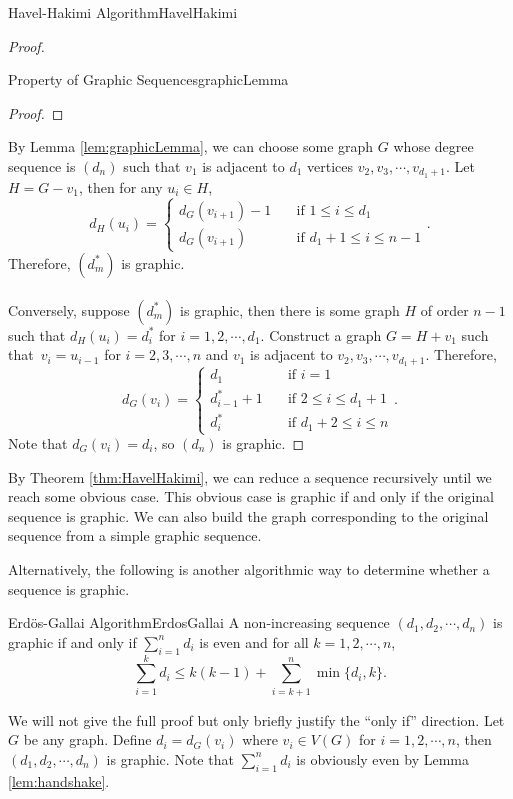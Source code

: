\documentclass[math]{amznotes}
\theoremstyle{remark}
\newcommand{\0}{\mathbf{0}}
\newcommand{\1}{\mathbf{1}}
\begin{document}
\begin{thmbox}{Havel-Hakimi Algorithm}{HavelHakimi}
\begin{proof}
\begin{lembox}{Property of Graphic Sequences}{graphicLemma}
\begin{proof}
            \end{proof}
        \end{lembox}
        By Lemma \ref{lem:graphicLemma}, we can choose some graph $G$ whose degree sequence is $(d_n)$ such that $v_1$ is adjacent to $d_1$ vertices $v_2, v_3, \cdots, v_{d_1 + 1}$. Let $H = G - v_1$, then for any $u_i \in H$,
        \begin{equation*}
            d_H(u_i) = \begin{cases}
                d_G(v_{i + 1}) - 1 & \quad\textrm{if } 1 \leq i \leq d_1 \\
                d_G(v_{i + 1}) & \quad\textrm{if } d_1 + 1 \leq i \leq n - 1
            \end{cases}.
        \end{equation*}
        Therefore, $\left(d^*_m\right)$ is graphic.
        \\\\
        Conversely, suppose $\left(d^*_m\right)$ is graphic, then there is some graph $H$ of order $n - 1$ such that $d_H(u_i) = d^*_i$ for $i = 1, 2, \cdots, d_1$. Construct a graph $G = H + v_1$ such that~$v_i = u_{i - 1}$ for $i = 2, 3, \cdots, n$ and $v_1$ is adjacent to $v_2, v_3, \cdots, v_{d_1 + 1}$. Therefore,
        \begin{equation*}
            d_G(v_i) = \begin{cases}
                d_1 & \quad\textrm{if } i = 1 \\
                d^*_{i - 1} + 1 & \quad\textrm{if } 2 \leq i \leq d_1 + 1 \\
                d^*_{i} & \quad\textrm{if } d_1 + 2 \leq i \leq n
            \end{cases}.
        \end{equation*}
        Note that $d_G(v_i) = d_i$, so $(d_n)$ is graphic.
    \end{proof}
\end{thmbox}
By Theorem \ref{thm:HavelHakimi}, we can reduce a sequence recursively until we reach some obvious case. This obvious case is graphic if and only if the original sequence is graphic. We can also build the graph corresponding to the original sequence from a simple graphic sequence.

Alternatively, the following is another algorithmic way to determine whether a sequence is graphic.
\begin{thmbox}{Erd\"{o}s-Gallai Algorithm}{ErdosGallai}
    A non-increasing sequence $(d_1, d_2, \cdots, d_n)$ is graphic if and only if $\sum_{i = 1}^n d_i$ is even and for all $k = 1, 2, \cdots, n$,
    \begin{equation*}
        \sum_{i = 1}^{k} d_i \leq k(k - 1) + \sum_{i = k + 1}^{n}\min\{d_i, k\}.
    \end{equation*}
\end{thmbox}
We will not give the full proof but only briefly justify the ``only if'' direction. Let $G$ be any graph. Define $d_i = d_G(v_i)$ where $v_i \in V(G)$ for $i = 1, 2, \cdots, n$, then $(d_1, d_2, \cdots, d_n)$ is graphic. Note that $\sum_{i = 1}^{n}d_i$ is obviously even by Lemma \ref{lem:handshake}. 
\end{document}
